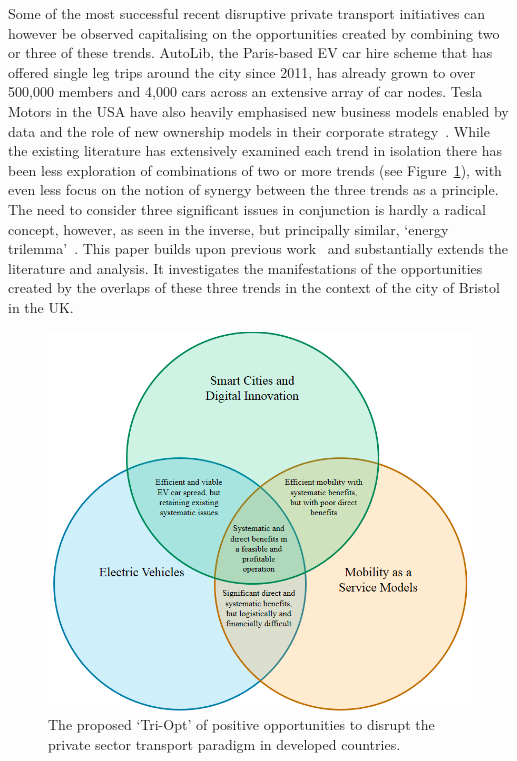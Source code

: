 \documentclass[b5paper,10pt]{article}
\begin{document}
Some of the most successful recent disruptive private transport
initiatives can however be observed capitalising on the opportunities
created by combining two or three of these trends. AutoLib, the
Paris-based EV car hire scheme that has offered single leg trips
around the city since 2011, has already grown to over 500,000 members
and 4,000 cars across an extensive array of car nodes. Tesla Motors in
the USA have also heavily emphasised new business models enabled by
data and the role of new ownership models in their corporate
strategy~\citep{musk:2016}. While the existing literature has
extensively examined each trend in isolation there has been less
exploration of combinations of two or more trends (see
Figure~\ref{fig:triopt}), with even less focus on the notion of
synergy between the three trends as a principle. The need to consider
three significant issues in conjunction is hardly a radical concept,
however, as seen in the inverse, but principally similar, `energy
trilemma'~\citep{wec:2015}. This paper builds upon previous
work~\citep{cooper-et-al-sose:2015} and substantially extends the
literature and analysis. It investigates the manifestations of the
opportunities created by the overlaps of these three trends in the
context of the city of Bristol in the UK.

\begin{figure}[htb]
\centering
\includegraphics[width=0.6\columnwidth]{images/triopt.png}
\caption{The proposed `Tri-Opt' of positive opportunities to disrupt
  the private sector transport paradigm in developed countries.}
\label{fig:triopt}
\end{figure}

\end{document}
